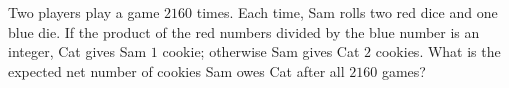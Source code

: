 Two players play a game $2160$ times. Each time, Sam rolls two red dice and one blue die. If the product of the red numbers divided by the blue number is an integer, Cat gives Sam $1$ cookie; otherwise Sam gives Cat $2$ cookies. What is the expected net number of cookies Sam owes Cat after all $2160$ games?

